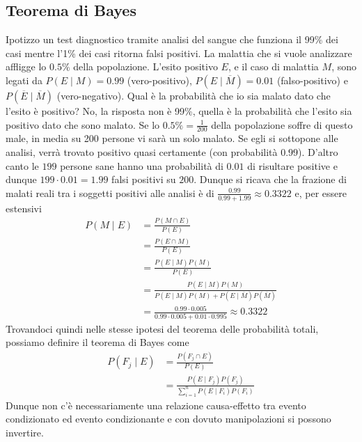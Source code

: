 \documentclass[11pt]{report}
\begin{document}
\subsection{Teorema di Bayes}
Ipotizzo un test diagnostico tramite analisi del sangue che funziona il 99\% dei casi mentre l'1\% dei casi ritorna falsi positivi. La malattia che si vuole analizzare affligge lo $0.5\%$ della popolazione. L'esito positivo $E$, e il caso di malattia $M$, sono legati da $P(E \mid M) = 0.99$ (vero-positivo), $P(E \mid \overline{M}) = 0.01$ (falso-positivo) e $P(\overline{E} \mid \overline{M})$ (vero-negativo). Qual è la probabilità che io sia malato dato che l'esito è positivo? No, la risposta non è 99\%, quella è la probabilità che l'esito sia positivo dato che sono malato. Se lo $0.5\% = \frac{1}{200}$ della popolazione soffre di questo male, in media su 200 persone vi sarà un solo malato. Se egli si sottopone alle analisi, verrà trovato positivo quasi certamente (con probabilità $0.99$). D'altro canto le $199$ persone sane hanno una probabilità di $0.01$ di risultare positive e dunque $199 \cdot 0.01 = 1.99$ falsi positivi su $200$. Dunque si ricava che la frazione di malati reali tra i soggetti positivi alle analisi è di $\frac{0.99}{0.99 + 1.99} \approx 0.3322$ e, per essere estensivi
\begin{equation}
    \begin{split}
        P(M \mid E) & = \frac{P(M \cap E)}{P(E)}\\
        & = \frac{P(E \cap M)}{P(E)}\\
        & = \frac{P(E \mid M)P(M)}{P(E)}\\
        & = \frac{P(E \mid M)P(M)}{P(E \mid M)P(M) + P(E \mid \overline{M})P(\overline{M})}\\
        & = \frac{0.99 \cdot 0.005}{0.99 \cdot 0.005 + 0.01 \cdot 0.995} \approx 0.3322
    \end{split}
\end{equation}
Trovandoci quindi nelle stesse ipotesi del teorema delle probabilità totali, possiamo definire il teorema di Bayes come
\begin{equation}
    \begin{split}
        P(F_j \mid E) & = \frac{P(F_j \cap E)}{P(E)}\\
        & = \frac{P(E \mid F_j)P(F_j)}{\sum_{i=1}^{n}P(E \mid F_i)P(F_i)}
    \end{split}
\end{equation}
Dunque non c'è necessariamente una relazione causa-effetto tra evento condizionato ed evento condizionante e con dovuto manipolazioni si possono invertire.
\end{document}
